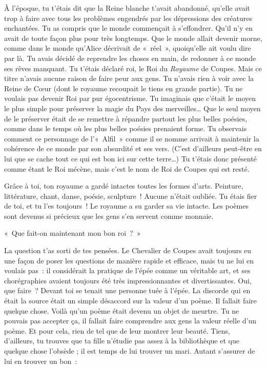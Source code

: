 {{À l’époque, tu t’étais dit que la Reine blanche t’avait abandonné, qu’elle avait trop à faire avec tous les problèmes engendrés par les dépressions des créatures enchantées.
Tu as compris que le monde commençait à s’effondrer.  Qu’il n’y en avait de toute façon plus pour très longtemps.  Que le monde allait devenir morne, comme dans le monde qu’Alice décrivait de «~réel~», quoiqu’elle ait voulu dire par là.
Tu avais décidé de reprendre les choses en main, de redonner à ce monde ses rêves manquant.
Tu t’étais déclaré roi, le Roi du \emph{Royaume} de Coupes.
Mais ce titre n’avais aucune raison de faire peur aux gens.
Tu n’avais rien à voir avec la Reine de Cœur (dont le royaume recoupait le tiens en grande partie).  Tu ne voulais pas devenir Roi par pur égocentrisme.
Tu imaginais que c’était le moyen le plus simple pour préserver la magie du Pays des merveilles…
Que le seul moyen de le préserver était de se remettre à répandre partout les plus belles poésies, comme dans le temps où les plus belles poésies prenaient forme.
Tu observais comment ce personnage de l’«~Alfil~» comme il se nomme arrivait à maintenir la cohérence de ce monde par son absurdité et ses vers.  (C’est d’ailleurs peut-être en lui que se cache tout ce qui est bon ici sur cette terre…)
Tu t’étais donc présenté comme étant le Roi mécène, mais c’est le nom de Roi de Coupes qui est resté.

Grâce à toi, ton royaume a gardé intactes toutes les formes d’arts.  Peinture, littérature, chant, danse, poésie, sculpture~!  Aucune n’était oubliée.
Tu étais fier de toi, et tu l’es toujours~!
Le royaume a su garder sa vie intacte.
Les poèmes sont devenus si précieux que les gens s’en servent comme monnaie.

«~Que fait-on maintenant mon bon roi~?~»

La question t’as sorti de tes pensées.
Le Chevalier de Coupes avait toujours eu une façon de poser les questions de manière rapide et efficace, mais tu ne lui en voulais pas~:  il considérait la pratique de l’épée comme un véritable art, et ses chorégraphies avaient toujours été très impressionnantes et divertissantes.
Oui, que faire~?
Devant toi se tenait une personne tuée à l’épée.
La discorde qui en était la source était un simple désaccord sur la valeur d’un poème.
Il fallait faire quelque chose.  Voilà qu’un poème était devenu un objet de meurtre.
Tu ne pouvais pas accepter ça, il fallait faire comprendre aux gens la valeur réelle d’un poème.
Et pour cela, rien de tel que de leur montrer leur beauté.
Tiens, d’ailleurs, tu trouves que ta fille n’étudie pas assez à la bibliothèque et que quelque chose l’obsède ; il est temps de lui trouver un mari.
Autant s’assurer de lui en trouver un bon~:

}}
